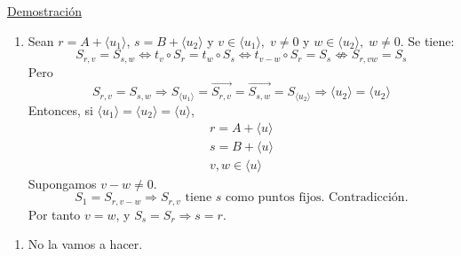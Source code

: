 \documentclass[12pt, a4paper, ones, notitlepage, openany,titlepage]{article}
\newcommand{\dobleimplicacion}[2]{
	\begin{enumerate}[label=$\Rightarrow/$]
		\item #1
	\end{enumerate}
	\begin{enumerate}[label=$\Leftarrow/$]
		\item #2
	\end{enumerate}
}
\newcommand{\demostracion}{\noindent\underline{Demostración}}
\begin{document}
\demostracion
\dobleimplicacion{
	Sean $r = A + \langle u_1 \rangle$, $s = B + \langle u_2 \rangle$ y $v \in \langle u_1 \rangle, \; v \neq 0$ y $w \in \langle u_2 \rangle, \; w \neq 0$. Se tiene:
	$$
	S_{r,v} = S_{s,w} \Longleftrightarrow t_v \circ S_r = t_w \circ S_s \Longleftrightarrow t_{v-w} \circ S_r = S_s \not\Longleftrightarrow S_{r,vw} = S_s
	$$
	Pero
	$$
	S_{r,v} = S_{s,w} \Longrightarrow S_{\langle u_1 \rangle} = \overrightarrow{S_{r,v}} = \overrightarrow{S_{s,w}} = S_{\langle u_2 \rangle} \Longrightarrow \langle u_2 \rangle = \langle u_2 \rangle
	$$
	Entonces, si $\langle u_1 \rangle = \langle u_2 \rangle = \langle u \rangle$,
	$$
	\begin{array}{c}
		r = A + \langle u \rangle \\
		s = B + \langle u \rangle \\
		v,w \in \langle u \rangle
	\end{array}
	$$
	Supongamos $v - w \neq 0$.
	$$
	S_1 = S_{r,v-w} \Longrightarrow S_{r,v} \text{ tiene $s$ como puntos fijos. Contradicción.}
	$$
	Por tanto $v = w$, y $S_s = S_r \Longrightarrow s = r$.
}{
	No la vamos a hacer.
}
\end{document}
